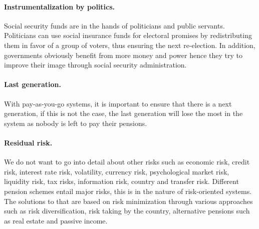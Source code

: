 

\paragraph{Instrumentalization by politics.} Social security funds are in the hands of politicians and public servants. Politicians can use social insurance funds for electoral promises by redistributing them in favor of a group of voters, thus ensuring the next re-election. In addition, governments obviously benefit from more money and power hence they try to improve their image through social security administration. \cite{zweifel_insurance_2012}

\paragraph{Last generation.} With pay-as-you-go systems, it is important to ensure that there is a next generation, if this is not the case, the last generation will lose the most in the system as nobody is left to pay their pensions.

\paragraph{Residual risk.} 
We do not want to go into detail about other risks such as economic risk, credit risk, interest rate risk, volatility, currency risk, psychological market risk, liquidity risk, tax risks, information risk, country and transfer risk.
Different pension schemes entail major risks, this is in the nature of risk-oriented systems. The solutions to that are based on risk minimization through various approaches such as risk diversification, risk taking by the country, alternative pensions such as real estate and passive income.


